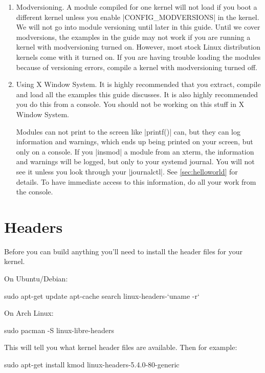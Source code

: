 \documentclass[10pt, oneside]{book}
\begin{document}
\begin{enumerate}
  \item Modversioning.
        A module compiled for one kernel will not load if you boot a different kernel unless you enable \cpp|CONFIG_MODVERSIONS| in the kernel.
        We will not go into module versioning until later in this guide.
        Until we cover modversions, the examples in the guide may not work if you are running a kernel with modversioning turned on.
        However, most stock Linux distribution kernels come with it turned on.
        If you are having trouble loading the modules because of versioning errors, compile a kernel with modversioning turned off.

  \item Using X Window System.
  \label{sec:using_x}
        It is highly recommended that you extract, compile and load all the examples this guide discusses.
        It is also highly recommended you do this from a console.
        You should not be working on this stuff in X Window System.

        Modules can not print to the screen like \cpp|printf()| can, but they can log information and warnings, which ends up being printed on your screen, but only on a console.
        If you \sh|insmod| a module from an xterm, the information and warnings will be logged, but only to your systemd journal.
        You will not see it unless you look through your \sh|journalctl|.
        See \ref{sec:helloworld} for details.
        To have immediate access to this information, do all your work from the console.
\end{enumerate}

\section{Headers}
\label{sec:headers}
Before you can build anything you'll need to install the header files for your kernel.

On Ubuntu/Debian:
\begin{codebash}
sudo apt-get update
apt-cache search linux-headers-`uname -r`
\end{codebash}

On Arch Linux:
\begin{codebash}
sudo pacman -S linux-libre-headers
\end{codebash}

This will tell you what kernel header files are available.
Then for example:
\begin{codebash}
sudo apt-get install kmod linux-headers-5.4.0-80-generic
\end{codebash}
\end{document}
